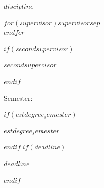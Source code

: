 \documentclass[$if(fontsize)$$fontsize$,$endif$$if(lang)$$lang$,$endif$$if(papersize)$$papersize$,$endif$$for(classoption)$$classoption$$sep$,$endfor$]{$documentclass$}
\begin{document}
\begin{titlepage}
  \noindent\begin{minipage}[t]{0.5\textwidth}
  \end{minipage}
  \begin{minipage}[t]{0.7\textwidth}
  \hspace{1cm}$discipline$
  \end{minipage}

  \noindent\begin{minipage}[t]{0.5\textwidth}
  \end{minipage}
  \begin{minipage}[t]{0.7\textwidth}
  \hspace*{1cm}$for(supervisor)$$supervisor$$sep$\\[-0.2em]\hspace*{1cm}$endfor$
  \end{minipage}

$if(secondsupervisor)$
  \noindent\begin{minipage}[t]{0.5\textwidth}
  \end{minipage}
  \begin{minipage}[t]{0.7\textwidth}
  \hspace{1cm}$secondsupervisor$
  \end{minipage}

$endif$
  \noindent\begin{minipage}[t]{0.5\textwidth}
  Semester:
  \end{minipage}
  \begin{minipage}[t]{0.7\textwidth}
  \hspace{1cm}
  \end{minipage}

$if(estdegree_semester)$
  \noindent\begin{minipage}[t]{0.5\textwidth}
  \end{minipage}
  \begin{minipage}[t]{0.7\textwidth}
  \hspace{1cm}$estdegree_semester$
  \end{minipage}

$endif$
$if(deadline)$
  \noindent\begin{minipage}[t]{0.5\textwidth}
  \end{minipage}
  \begin{minipage}[t]{0.7\textwidth}
  \hspace{1cm}$deadline$
  \end{minipage}

$endif$

\end{titlepage}
\end{document}
